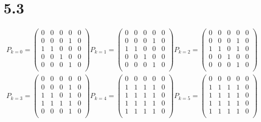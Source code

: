 \documentclass[12pt.twoside,a4paper,notitlepage,parskip]{scrartcl}
\begin{document}
\section*{5.3}
\begin{align*}
P_{k=0}=
\begin{pmatrix}
	0 & 0 & 0 & 0 & 0\\
	0 & 0 & 0 & 1 & 0\\
	1 & 1 & 0 & 0 & 0\\
	0 & 0 & 1 & 0 & 0\\
	0 & 0 & 0 & 1 & 0\\
\end{pmatrix}
P_{k=1}=
\begin{pmatrix}
	0 & 0 & 0 & 0 & 0\\
	0 & 0 & 0 & 1 & 0\\
	1 & 1 & 0 & 0 & 0\\
	0 & 0 & 1 & 0 & 0\\
	0 & 0 & 0 & 1 & 0\\
\end{pmatrix}
P_{k=2}=
\begin{pmatrix}	
	0 & 0 & 0 & 0 & 0\\
	0 & 0 & 0 & 1 & 0\\
	1 & 1 & 0 & 1 & 0\\
	0 & 0 & 1 & 0 & 0\\
	0 & 0 & 0 & 1 & 0\\
\end{pmatrix}\\
P_{k=3}=
\begin{pmatrix}
	0 & 0 & 0 & 0 & 0\\
	0 & 0 & 0 & 1 & 0\\
	1 & 1 & 0 & 1 & 0\\
	1 & 1 & 1 & 1 & 0\\
	0 & 0 & 0 & 1 & 0\\
\end{pmatrix}
P_{k=4}=
\begin{pmatrix}
	0 & 0 & 0 & 0 & 0\\
	1 & 1 & 1 & 1 & 0\\
	1 & 1 & 1 & 1 & 0\\
	1 & 1 & 1 & 1 & 0\\
	1 & 1 & 1 & 1 & 0\\
\end{pmatrix}
P_{k=5}=
\begin{pmatrix}
	0 & 0 & 0 & 0 & 0\\
	1 & 1 & 1 & 1 & 0\\
	1 & 1 & 1 & 1 & 0\\
	1 & 1 & 1 & 1 & 0\\
	1 & 1 & 1 & 1 & 0\\
\end{pmatrix}
\end{align*}
\end{document}
